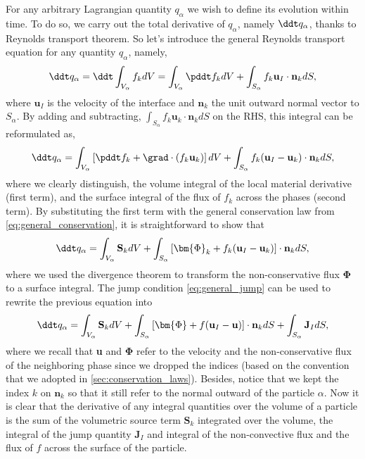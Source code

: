 For any arbitrary Lagrangian quantity $q_\alpha$ we wish to define its evolution within time. 
To do so, we carry out the total derivative of $q_\alpha$, namely $\ddt q_\alpha$, thanks to Reynolds transport theorem.
So let's introduce the general Reynolds transport equation for any quantity $q_\alpha$, namely, 
\begin{equation*}
    \ddt  q_\alpha 
    = \ddt \int_{V_\alpha} f_k dV 
    = \int_{V_\alpha} \pddt f_kdV 
    + \int_{S_\alpha} f_k \textbf{u}_I \cdot \textbf{n}_k d S,
\end{equation*}
where $\textbf{u}_I$ is the velocity of the interface and $\textbf{n}_k$ the unit outward normal vector to $S_\alpha$. 
By adding and subtracting, $\int_{S_\alpha} f_k \textbf{u}_k\cdot \textbf{n}_k dS$ on the RHS,  this integral can be reformulated as,
\begin{equation}
    \ddt  q_\alpha 
    = \int_{V_\alpha}\left[ \pddt f_k + \grad \cdot\left(f_k\textbf{u}_k\right) \right]dV 
    + \int_{S_\alpha} f_k (\textbf{u}_I-\textbf{u}_k)\cdot \textbf{n}_k d S,
    \label{eq:q_alpha_dt}
\end{equation}
where we clearly distinguish, the volume integral of the local material derivative (first term), and the surface integral of the flux of $f_k$ across the phases (second term).
By substituting the first term with the general conservation law from \ref{eq:general_conservation}, it is straightforward to show that 
\begin{equation}
    \ddt  q_\alpha 
    = \int_{V_\alpha} \textbf{S}_k dV 
    + \int_{S_\alpha} \left[\bm{\Phi}_k + f_k (\textbf{u}_I-\textbf{u}_k) \right] \cdot \textbf{n}_k d S,
\end{equation}
where we used the divergence theorem to transform the non-conservative flux $\bm{\Phi}$ to a surface integral. 
The jump condition \ref{eq:general_jump} can be used to rewrite the previous equation into
\begin{equation}
    \ddt  q_\alpha 
    = \int_{V_\alpha} \textbf{S}_k dV 
    + \int_{S_\alpha} \left[\bm{\Phi} + f (\textbf{u}_I-\textbf{u}) \right] \cdot \textbf{n}_k d S
    + \int_{S_\alpha} \textbf{J}_I dS,
    \label{eq:q_alpha_balance}
\end{equation}
where we recall that \textbf{u} and $\bm{\Phi}$ refer to the velocity and the non-conservative flux of the neighboring phase since we dropped the indices (based on the convention that we adopted in \ref{sec:conservation_laws}). 
Besides, notice that we kept the index $k$ on $\textbf{n}_k$ so that it still refer to the normal outward of the particle $\alpha$. 
Now it is clear that the derivative of any integral quantities over the volume of a particle is the sum of the volumetric source term $\textbf{S}_k$ integrated over the volume, the integral of the jump quantity $\textbf{J}_I$ and integral of the non-convective flux and the flux of $f$ across the surface of the particle. 

